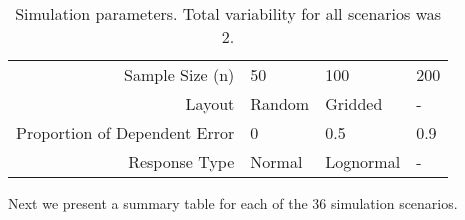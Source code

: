 \documentclass[]{elsarticle} %
\begin{document}
\begin{table}[ht]
\centering
\begin{tabular}{r|lll}
   \hline
Sample Size (n) & 50 & 100 & 200 \\ 
  Layout & Random & Gridded & - \\ 
  Proportion of Dependent Error & 0 & 0.5 & 0.9 \\ 
  Response Type & Normal & Lognormal & - \\ 
   \hline
\end{tabular}
\caption{\label{tab:parmtab} Simulation parameters. Total variability for all scenarios was 2.} 
\end{table}

Next we present a summary table for each of the 36 simulation scenarios.

\begin{table}[ht]
\centering
{}
\caption{Approach, layout (Layout), response type (Response) roportion of dependent error (DE Prop), sample size (n), mean (prediction) bias (Bias), root-mean-squared-(prediction) error (rMS(P)E), and 95\% interval coverage (Coverage) for a simulation scenario.} 
\end{table}
\begin{table}[ht]
\centering
{}
\caption{Approach, layout (Layout), response type (Response) roportion of dependent error (DE Prop), sample size (n), mean (prediction) bias (Bias), root-mean-squared-(prediction) error (rMS(P)E), and 95\% interval coverage (Coverage) for a simulation scenario.} 
\end{table}
\end{document}
